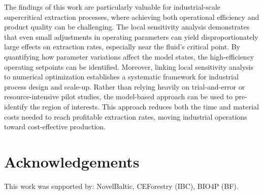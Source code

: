 \documentclass[a4paper,fleqn]{cas-dc}
\begin{document}
	The findings of this work are particularly valuable for industrial-scale supercritical extraction processes, where achieving both operational efficiency and product quality can be challenging. The local sensitivity analysis demonstrates that even small adjustments in operating parameters can yield disproportionately large effects on extraction rates, especially near the fluid’s critical point. By quantifying how parameter variations affect the model states, the high-efficiency operating setpoints can be identified. Moreover, linking local sensitivity analysis to numerical optimization establishes a systematic framework for industrial process design and scale-up. Rather than relying heavily on trial-and-error or resource-intensive pilot studies, the model-based approach can be used to pre-identify the region of interests. This approach reduces both the time and material costs needed to reach profitable extraction rates, moving industrial operations toward cost-effective production.
	
	\section*{Acknowledgements} 
	This work was supported by: NovelBaltic, CEForestry (IBC), BIO4P (BF).
	
	\clearpage
	
	
	
	
\end{document}
